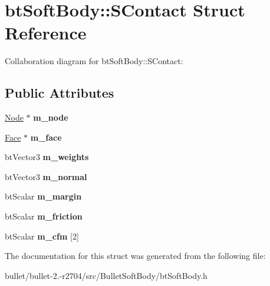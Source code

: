 \hypertarget{structbt_soft_body_1_1_s_contact}{\section{bt\+Soft\+Body\+:\+:S\+Contact Struct Reference}
\label{structbt_soft_body_1_1_s_contact}
}


Collaboration diagram for bt\+Soft\+Body\+:\+:S\+Contact\+:
\subsection*{Public Attributes}
\begin{DoxyCompactItemize}
\item 
\hypertarget{structbt_soft_body_1_1_s_contact_a969a9b23a1b807135afb300daa9f3901}{\hyperlink{structbt_soft_body_1_1_node}{Node} $\ast$ {\bfseries m\+\_\+node}}\label{structbt_soft_body_1_1_s_contact_a969a9b23a1b807135afb300daa9f3901}

\item 
\hypertarget{structbt_soft_body_1_1_s_contact_af232d111cf7074bc17075ea754658c76}{\hyperlink{structbt_soft_body_1_1_face}{Face} $\ast$ {\bfseries m\+\_\+face}}\label{structbt_soft_body_1_1_s_contact_af232d111cf7074bc17075ea754658c76}

\item 
\hypertarget{structbt_soft_body_1_1_s_contact_acc26bf2b8d7f3ee7528030336aefa5df}{bt\+Vector3 {\bfseries m\+\_\+weights}}\label{structbt_soft_body_1_1_s_contact_acc26bf2b8d7f3ee7528030336aefa5df}

\item 
\hypertarget{structbt_soft_body_1_1_s_contact_a8024b61fae8c8531d7bb083d0e5b23a4}{bt\+Vector3 {\bfseries m\+\_\+normal}}\label{structbt_soft_body_1_1_s_contact_a8024b61fae8c8531d7bb083d0e5b23a4}

\item 
\hypertarget{structbt_soft_body_1_1_s_contact_abda6249445903b4e143ecd1d537a4303}{bt\+Scalar {\bfseries m\+\_\+margin}}\label{structbt_soft_body_1_1_s_contact_abda6249445903b4e143ecd1d537a4303}

\item 
\hypertarget{structbt_soft_body_1_1_s_contact_ad094c94c16a779ee3982392400f7ac47}{bt\+Scalar {\bfseries m\+\_\+friction}}\label{structbt_soft_body_1_1_s_contact_ad094c94c16a779ee3982392400f7ac47}

\item 
\hypertarget{structbt_soft_body_1_1_s_contact_acd2e9e6885709d44581565c49bb0872f}{bt\+Scalar {\bfseries m\+\_\+cfm} \mbox{[}2\mbox{]}}\label{structbt_soft_body_1_1_s_contact_acd2e9e6885709d44581565c49bb0872f}

\end{DoxyCompactItemize}


The documentation for this struct was generated from the following file\+:\begin{DoxyCompactItemize}
\item 
bullet/bullet-\/2.-\/r2704/src/\+Bullet\+Soft\+Body/bt\+Soft\+Body.\+h\end{DoxyCompactItemize}
